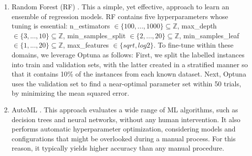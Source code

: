 \begin{enumerate}[leftmargin=*]
    \item Random Forest (RF) \cite{DBLP:conf/icdar/Ho95}. This a simple, yet effective, approach to learn an ensemble of regression models. RF contains five hyperparameters whose tuning is essential: n\_estimators $\in \{100, ..., 1000\} \subseteq \mathbb{Z}$,  max\_depth  $ \in \{3,...,10\} \subseteq \mathbb{Z}$, min\_samples\_split $\in \{2,...,20\} \subseteq \mathbb{Z}$, min\_samples\_leaf $\in \{1,...,20\} \subseteq \mathbb{Z}$, max\_features $\in \{ sqrt, log2\}$.
    To fine-tune within these domains, we leverage Optuna as follows: First, we split the labelled instances into train and validation sets, with the latter created in a stratified manner so that it contains 10\% of the instances from each known dataset. Next, Optuna uses the validation set to find a near-optimal parameter set within 50 trials, by minimizing the mean squared error. 
    \item AutoML \cite{DBLP:journals/kbs/HeZC21}. 
    This approach evaluates a wide range of ML algorithms, such as decision trees and neural networks, without any human intervention. It also performs automatic hyperparameter optimization, considering models and configurations that might be overlooked during a manual process. For this reason, it typically yields higher accuracy than any manual procedure.

\end{enumerate}
